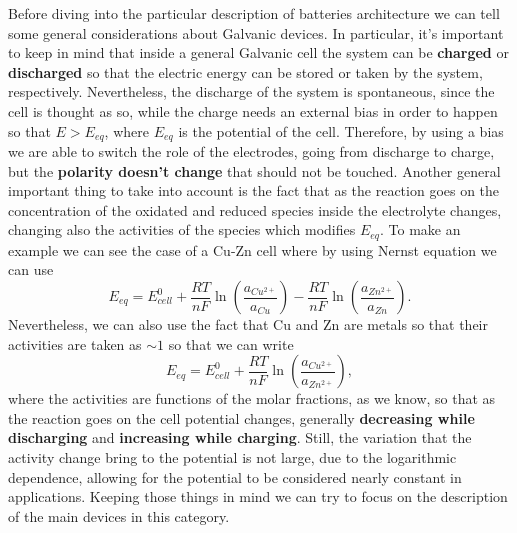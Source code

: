 Before diving into the particular description of batteries architecture we can tell some general considerations about Galvanic devices. In particular, it's important to keep in mind that inside a general Galvanic cell the system can be \textbf{charged} or \textbf{discharged} so that the electric energy can be stored or taken by the system, respectively. Nevertheless, the discharge of the system is spontaneous, since the cell is thought as so, while the charge needs an external bias in order to happen so that $E > E_{eq}$, where $E_{eq}$ is the potential of the cell. Therefore, by using a bias we are able to switch the role of the electrodes, going from discharge to charge, but the \textbf{polarity doesn't change} that should not be touched. Another general important thing to take into account is the fact that as the reaction goes on the concentration of the oxidated and reduced species inside the electrolyte changes, changing also the activities of the species which modifies $E_{eq}$. To make an example we can see the case of a Cu-Zn cell where by using Nernst equation we can use
\begin{equation}
    E_{eq} = E^0_{cell} + \frac{RT}{nF}\ln\left( \frac{a_{Cu^{2+}}}{a_{Cu}} \right) - \frac{RT}{nF}\ln\left( \frac{a_{Zn^{2+}}}{a_{Zn}} \right).
\end{equation}
Nevertheless, we can also use the fact that Cu and Zn are metals so that their activities are taken as $\sim 1$ so that we can write
\begin{equation}
    E_{eq} = E^0_{cell} + \frac{RT}{nF}\ln\left( \frac{a_{Cu^{2+}}}{a_{Zn^{2+}}} \right),
\end{equation}
where the activities are functions of the molar fractions, as we know, so that as the reaction goes on the cell potential changes, generally \textbf{decreasing while discharging} and \textbf{increasing while charging}. Still, the variation that the activity change bring to the potential is not large, due to the logarithmic dependence, allowing for the potential to be considered nearly constant in applications. Keeping those things in mind we can try to focus on the description of the main devices in this category.

